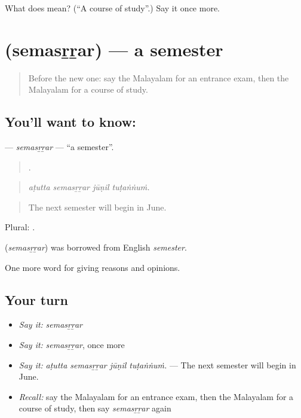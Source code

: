 \begin{tcolorbox}[breakable,colback=teal!4,colframe=teal!35!black,title={Before you move on}]
What does  mean? (\textquotedblleft{}A course of study\textquotedblright{}.) Say it once more.
\end{tcolorbox}
\section[\texorpdfstring{\ml{സെമസ്റ്റർ} (semasṟṟar)}{സെമസ്റ്റർ (semasṟṟar)}]{ (semasṟṟar) — a semester}

\label{lesson:ML-C433-semasrrar}



\begin{quote}
Before the new one: say the Malayalam for an entrance exam, then the Malayalam for a course of study.
\end{quote}

\subsection*{You'll want to know: }
\textbf{} — \emph{semasṟṟar} — \textquotedblleft{}a semester\textquotedblright{}.

\begin{quote}
   .
\end{quote}

\begin{quote}
\emph{aṭutta semasṟṟar jūṇil tuṭaṅṅuṁ.}
\end{quote}

\begin{quote}
The next semester will begin in June.
\end{quote}

Plural: .

\begin{cousinweb}
\textbf{} (\emph{semasṟṟar}) was borrowed from English \emph{semester}.
\end{cousinweb}

\begin{grammarlens}[title={What you've built}]
One more word for giving reasons and opinions.
\end{grammarlens}

\subsection*{Your turn}
\begin{itemize}
\raggedright
  \item \emph{Say it:} \emph{semasṟṟar}
  \item \emph{Say it:} \emph{semasṟṟar}, once more
  \item \emph{Say it:} \emph{aṭutta semasṟṟar jūṇil tuṭaṅṅuṁ.} — The next semester will begin in June.
  \item \emph{Recall:} say the Malayalam for an entrance exam, then the Malayalam for a course of study, then say \emph{semasṟṟar} again
\end{itemize}

